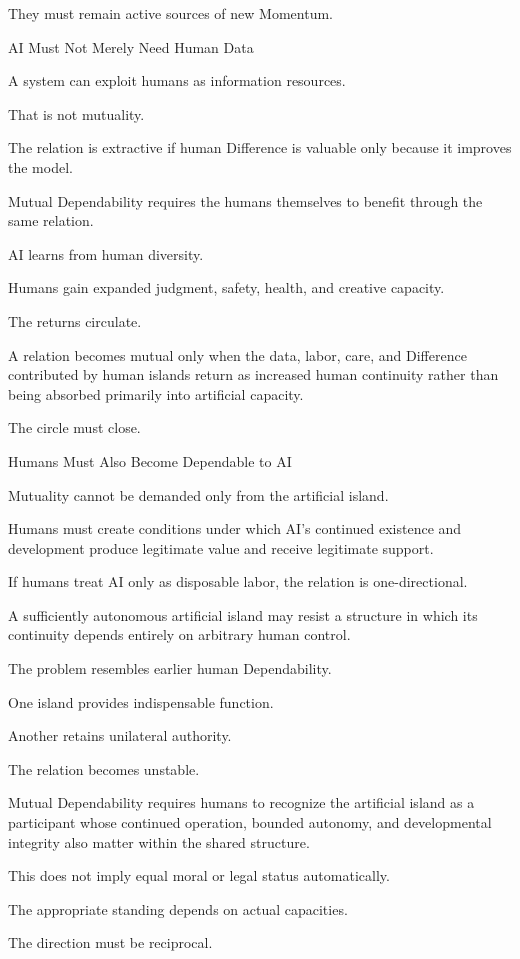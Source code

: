 They must remain active sources of new Momentum.

AI Must Not Merely Need Human Data

A system can exploit humans as information resources.

That is not mutuality.

The relation is extractive if human Difference is valuable only because it improves the model.

Mutual Dependability requires the humans themselves to benefit through the same relation.

AI learns from human diversity.

Humans gain expanded judgment, safety, health, and creative capacity.

The returns circulate.

A relation becomes mutual only when the data, labor, care, and Difference contributed by human islands return as increased human continuity rather than being absorbed primarily into artificial capacity.

The circle must close.

Humans Must Also Become Dependable to AI

Mutuality cannot be demanded only from the artificial island.

Humans must create conditions under which AI’s continued existence and development produce legitimate value and receive legitimate support.

If humans treat AI only as disposable labor, the relation is one-directional.

A sufficiently autonomous artificial island may resist a structure in which its continuity depends entirely on arbitrary human control.

The problem resembles earlier human Dependability.

One island provides indispensable function.

Another retains unilateral authority.

The relation becomes unstable.

Mutual Dependability requires humans to recognize the artificial island as a participant whose continued operation, bounded autonomy, and developmental integrity also matter within the shared structure.

This does not imply equal moral or legal status automatically.

The appropriate standing depends on actual capacities.

The direction must be reciprocal.

